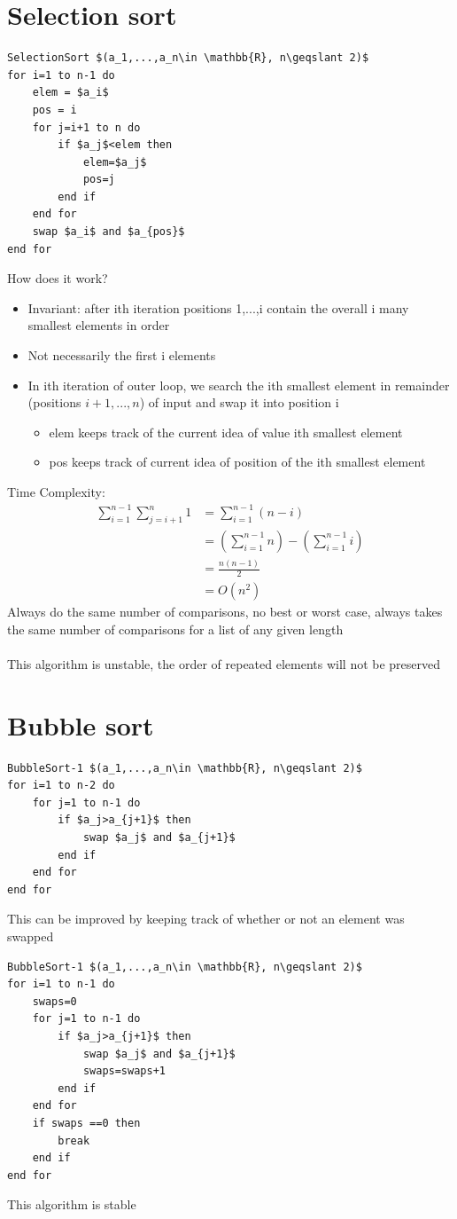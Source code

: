 \documentclass{article}[18pt]
\begin{document}
\section{Selection sort}
\begin{lstlisting}
SelectionSort $(a_1,...,a_n\in \mathbb{R}, n\geqslant 2)$
for i=1 to n-1 do
	elem = $a_i$
	pos = i
	for j=i+1 to n do
		if $a_j$<elem then
			elem=$a_j$
			pos=j
		end if
	end for
	swap $a_i$ and $a_{pos}$
end for			
\end{lstlisting}
How does it work?
\begin{itemize}
	\item Invariant: after ith iteration positions 1,...,i contain the overall i many smallest elements in order
	\item Not necessarily the first i elements
	\item In ith iteration of outer loop, we search the ith smallest element in remainder (positions $i+1,...,n$) of input and swap it into position i
	\begin{itemize}
		\item elem keeps track of the current idea of value ith smallest element
		\item pos keeps track of current idea of position of the ith smallest element
	\end{itemize}
\end{itemize}
Time Complexity:
$$\begin{aligned} \sum _ { i = 1 } ^ { n - 1 } \sum _ { j = i + 1 } ^ { n } 1 & = \sum _ { i = 1 } ^ { n - 1 } ( n - i ) \\ & = \left( \sum _ { i = 1 } ^ { n - 1 } n \right) - \left( \sum _ { i = 1 } ^ { n - 1 } i \right) \\ & = \frac { n ( n - 1 ) } { 2 } \\ & = O \left( n ^ { 2 } \right) \end{aligned}$$
Always do the same number of comparisons, no best or worst case, always takes the same number of comparisons for a list of any given length\\
\\
This algorithm is unstable, the order of repeated elements will not be preserved
\section{Bubble sort}
\begin{lstlisting}
BubbleSort-1 $(a_1,...,a_n\in \mathbb{R}, n\geqslant 2)$
for i=1 to n-2 do
	for j=1 to n-1 do
		if $a_j>a_{j+1}$ then
			swap $a_j$ and $a_{j+1}$
		end if
	end for
end for		
\end{lstlisting}
This can be improved by keeping track of whether or not an element was swapped
\begin{lstlisting}
BubbleSort-1 $(a_1,...,a_n\in \mathbb{R}, n\geqslant 2)$
for i=1 to n-1 do
	swaps=0
	for j=1 to n-1 do
		if $a_j>a_{j+1}$ then
			swap $a_j$ and $a_{j+1}$
			swaps=swaps+1
		end if
	end for
	if swaps ==0 then
		break
	end if
end for		
\end{lstlisting}
This algorithm is stable
\end{document}
